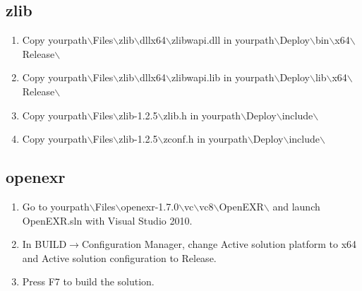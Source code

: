 \documentclass{beamer}
\begin{document}
\subsection{zlib}
\begin{frame}
  \begin{enumerate}
    \item Copy yourpath$\backslash$Files$\backslash$zlib$\backslash$dllx64$\backslash$zlibwapi.dll in yourpath$\backslash$Deploy$\backslash$bin$\backslash$x64$\backslash$Release$\backslash$
    \item Copy yourpath$\backslash$Files$\backslash$zlib$\backslash$dllx64$\backslash$zlibwapi.lib in yourpath$\backslash$Deploy$\backslash$lib$\backslash$x64$\backslash$Release$\backslash$
    \item Copy yourpath$\backslash$Files$\backslash$zlib-1.2.5$\backslash$zlib.h in yourpath$\backslash$Deploy$\backslash$include$\backslash$
    \item Copy yourpath$\backslash$Files$\backslash$zlib-1.2.5$\backslash$zconf.h in yourpath$\backslash$Deploy$\backslash$include$\backslash$
  \end{enumerate}
\end{frame}

\subsection{openexr}
\begin{frame}
  \begin{enumerate}
    \item Go to yourpath$\backslash$Files$\backslash$openexr-1.7.0$\backslash$vc$\backslash$vc8$\backslash$OpenEXR$\backslash$ and launch OpenEXR.sln with Visual Studio 2010.
    \item In BUILD$\rightarrow$Configuration Manager, change Active solution platform to x64 and Active solution configuration to Release.
    \item Press F7 to build the solution.
  \end{enumerate}
\end{frame}
\end{document}
